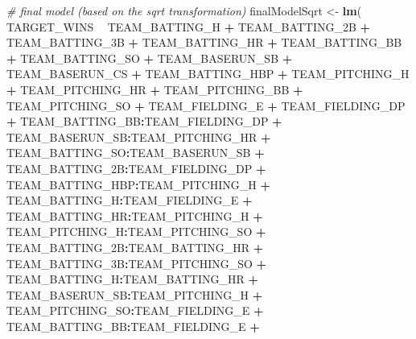 \documentclass[
]{article}
\newenvironment{Shaded}{\begin{snugshade}}{\end{snugshade}}
\newcommand{\CommentTok}[1]{\textcolor[rgb]{0.56,0.35,0.01}{\textit{#1}}}
\newcommand{\KeywordTok}[1]{\textcolor[rgb]{0.13,0.29,0.53}{\textbf{#1}}}
\newcommand{\NormalTok}[1]{#1}
\newcommand{\OperatorTok}[1]{\textcolor[rgb]{0.81,0.36,0.00}{\textbf{#1}}}
\newcommand{\StringTok}[1]{\textcolor[rgb]{0.31,0.60,0.02}{#1}}
\begin{document}
\begin{Shaded}
\begin{Highlighting}[]
\CommentTok{# final model (based on the sqrt transformation)}
\NormalTok{finalModelSqrt <-}\StringTok{ }\KeywordTok{lm}\NormalTok{(}
\NormalTok{        TARGET_WINS }\OperatorTok{~}\StringTok{ }\NormalTok{TEAM_BATTING_H }\OperatorTok{+}\StringTok{ }\NormalTok{TEAM_BATTING_2B }\OperatorTok{+}\StringTok{ }\NormalTok{TEAM_BATTING_3B }\OperatorTok{+}\StringTok{ }
\StringTok{                }\NormalTok{TEAM_BATTING_HR }\OperatorTok{+}\StringTok{ }\NormalTok{TEAM_BATTING_BB }\OperatorTok{+}\StringTok{ }\NormalTok{TEAM_BATTING_SO }\OperatorTok{+}\StringTok{ }\NormalTok{TEAM_BASERUN_SB }\OperatorTok{+}\StringTok{ }
\StringTok{                }\NormalTok{TEAM_BASERUN_CS }\OperatorTok{+}\StringTok{ }\NormalTok{TEAM_BATTING_HBP }\OperatorTok{+}\StringTok{ }\NormalTok{TEAM_PITCHING_H }\OperatorTok{+}\StringTok{ }\NormalTok{TEAM_PITCHING_HR }\OperatorTok{+}\StringTok{ }
\StringTok{                }\NormalTok{TEAM_PITCHING_BB }\OperatorTok{+}\StringTok{ }\NormalTok{TEAM_PITCHING_SO }\OperatorTok{+}\StringTok{ }\NormalTok{TEAM_FIELDING_E }\OperatorTok{+}\StringTok{ }\NormalTok{TEAM_FIELDING_DP }\OperatorTok{+}\StringTok{ }
\StringTok{                }\NormalTok{TEAM_BATTING_BB}\OperatorTok{:}\NormalTok{TEAM_FIELDING_DP }\OperatorTok{+}\StringTok{ }\NormalTok{TEAM_BASERUN_SB}\OperatorTok{:}\NormalTok{TEAM_PITCHING_HR }\OperatorTok{+}\StringTok{ }
\StringTok{                }\NormalTok{TEAM_BATTING_SO}\OperatorTok{:}\NormalTok{TEAM_BASERUN_SB }\OperatorTok{+}\StringTok{ }\NormalTok{TEAM_BATTING_2B}\OperatorTok{:}\NormalTok{TEAM_FIELDING_DP }\OperatorTok{+}\StringTok{ }
\StringTok{                }\NormalTok{TEAM_BATTING_HBP}\OperatorTok{:}\NormalTok{TEAM_PITCHING_H }\OperatorTok{+}\StringTok{ }\NormalTok{TEAM_BATTING_H}\OperatorTok{:}\NormalTok{TEAM_FIELDING_E }\OperatorTok{+}\StringTok{ }
\StringTok{                }\NormalTok{TEAM_BATTING_HR}\OperatorTok{:}\NormalTok{TEAM_PITCHING_H }\OperatorTok{+}\StringTok{ }\NormalTok{TEAM_PITCHING_H}\OperatorTok{:}\NormalTok{TEAM_PITCHING_SO }\OperatorTok{+}\StringTok{ }
\StringTok{                }\NormalTok{TEAM_BATTING_2B}\OperatorTok{:}\NormalTok{TEAM_BATTING_HR }\OperatorTok{+}\StringTok{ }\NormalTok{TEAM_BATTING_3B}\OperatorTok{:}\NormalTok{TEAM_PITCHING_SO }\OperatorTok{+}\StringTok{ }
\StringTok{                }\NormalTok{TEAM_BATTING_H}\OperatorTok{:}\NormalTok{TEAM_BATTING_HR }\OperatorTok{+}\StringTok{ }\NormalTok{TEAM_BASERUN_SB}\OperatorTok{:}\NormalTok{TEAM_PITCHING_H }\OperatorTok{+}\StringTok{ }
\StringTok{                }\NormalTok{TEAM_PITCHING_SO}\OperatorTok{:}\NormalTok{TEAM_FIELDING_E }\OperatorTok{+}\StringTok{ }\NormalTok{TEAM_BATTING_BB}\OperatorTok{:}\NormalTok{TEAM_FIELDING_E }\OperatorTok{+}\StringTok{ }

\end{Highlighting}
\end{Shaded}
\end{document}
